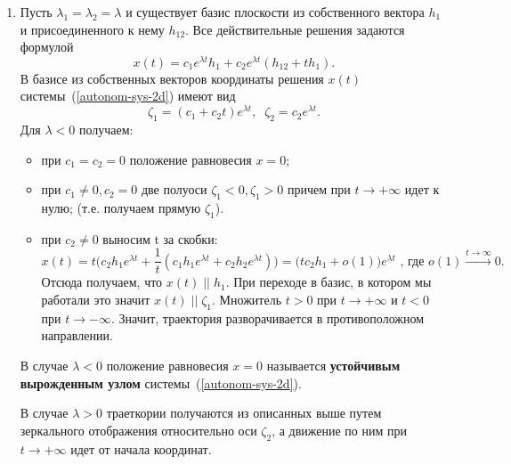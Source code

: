 \begin{enumerate}
\begin{enumerate}
     \item Пусть \(\lambda_1 = \lambda_2 = \lambda\) и существует базис плоскости из собственного вектора $h_1$ и присоединенного к нему $h_{12}$.
        Все действительные решения задаются формулой
        \[x(t) = c_1 e^{\lambda t} h_1 + c_2 e^{\lambda t} (h_{12} + t h_1).\]
        В базисе из собственных векторов координаты решения \(x(t)\) системы~(\ref{autonom-sys-2d}) имеют вид
        \[\zeta_1 = (c_1 + c_2 t) e^{\lambda t}, \;\; \zeta_2 =  c_2 e^{\lambda t}.\]
        Для \(\lambda < 0\) получаем:
        \begin{itemize}
            \item при \(c_1 = c_2 = 0\) положение равновесия \(x = 0\);
            \item при \(c_1 \neq 0, c_2 = 0\) две полуоси \(\zeta_1 < 0, \zeta_1 > 0\) причем при \(t \longrightarrow +\infty\) идет к нулю; (т.е. получаем прямую $\zeta_1$).
            \item при \(c_2 \neq 0\) выносим t за скобки:
            \[x(t) = t\Big(c_2h_1e^{\lambda t} + \frac{1}{t}(c_1h_1e^{\lambda t} + c_2h_{2}e^{\lambda t})\Big) = \big(tc_2h_1+o(1)\big)e^{\lambda t} \text{ , где $o(1) \stackrel{t\to\infty}{\longrightarrow} 0$.}\]  Отсюда получаем, что $x(t)\; ||\; h_1$. При переходе в базис, в котором мы работали это значит $x(t)\; ||\; \zeta_1$. Множитель $t > 0$ при \(t \longrightarrow +\infty\) и $t < 0$ при \(t \longrightarrow -\infty\). Значит, траектория разворачивается в противоположном направлении. 
        \end{itemize}
        В случае \(\lambda < 0\) положение равновесия $x = 0$ называется \textbf{устойчивым вырожденным узлом} системы~(\ref{autonom-sys-2d}).
        
        В случае \(\lambda > 0\) траеткории получаются из описанных выше путем зеркального отображения относительно оси $\zeta_2$, а движение по ним при \(t \longrightarrow +\infty\) идет от начала координат.
        

\end{enumerate}
\end{enumerate}
